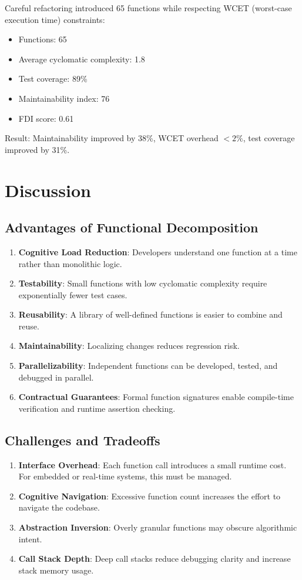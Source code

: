 \documentclass[a4paper,12pt]{article}
\theoremstyle{definition}
\begin{document}
Careful refactoring introduced 65 functions while respecting WCET (worst-case execution time) constraints:

\begin{itemize}
	\item Functions: 65
	\item Average cyclomatic complexity: 1.8
	\item Test coverage: 89\%
	\item Maintainability index: 76
	\item FDI score: 0.61
\end{itemize}

Result: Maintainability improved by 38\%, WCET overhead $< 2\%$, test coverage improved by 31\%.

\section{Discussion}

\subsection{Advantages of Functional Decomposition}

\begin{enumerate}
	\item \textbf{Cognitive Load Reduction}: Developers understand one function at a time rather than monolithic logic.
	\item \textbf{Testability}: Small functions with low cyclomatic complexity require exponentially fewer test cases.
	\item \textbf{Reusability}: A library of well-defined functions is easier to combine and reuse.
	\item \textbf{Maintainability}: Localizing changes reduces regression risk.
	\item \textbf{Parallelizability}: Independent functions can be developed, tested, and debugged in parallel.
	\item \textbf{Contractual Guarantees}: Formal function signatures enable compile-time verification and runtime assertion checking.
\end{enumerate}

\subsection{Challenges and Tradeoffs}

\begin{enumerate}
	\item \textbf{Interface Overhead}: Each function call introduces a small runtime cost. For embedded or real-time systems, this must be managed.
	\item \textbf{Cognitive Navigation}: Excessive function count increases the effort to navigate the codebase.
	\item \textbf{Abstraction Inversion}: Overly granular functions may obscure algorithmic intent.
	\item \textbf{Call Stack Depth}: Deep call stacks reduce debugging clarity and increase stack memory usage.
\end{enumerate}
\end{document}

